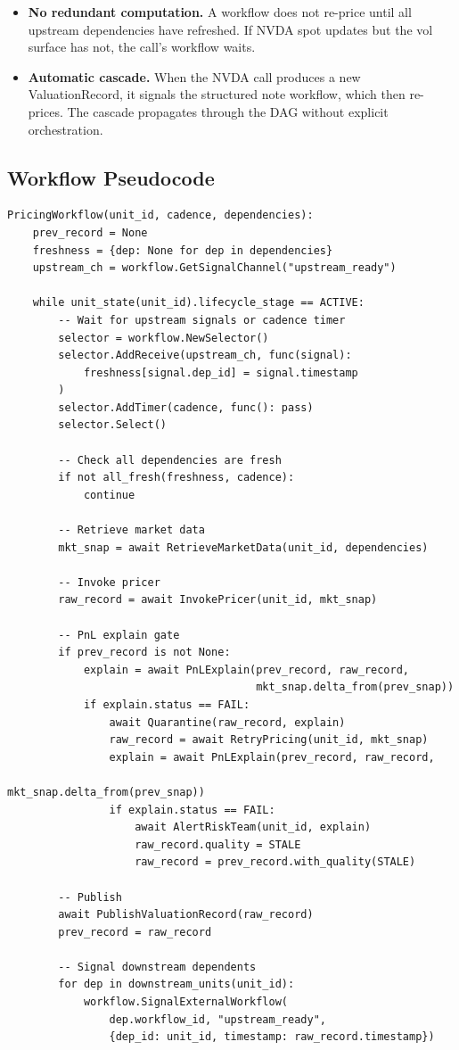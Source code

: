 \documentclass[11pt,a4paper]{article}
\begin{document}
\begin{itemize}[nosep]
\item \textbf{No redundant computation.}  A workflow does not re-price until all upstream dependencies have refreshed.  If NVDA spot updates but the vol surface has not, the call's workflow waits.
\item \textbf{Automatic cascade.}  When the NVDA call produces a new ValuationRecord, it signals the structured note workflow, which then re-prices.  The cascade propagates through the DAG without explicit orchestration.
\end{itemize}

\subsection{Workflow Pseudocode}

\begin{lstlisting}
PricingWorkflow(unit_id, cadence, dependencies):
    prev_record = None
    freshness = {dep: None for dep in dependencies}
    upstream_ch = workflow.GetSignalChannel("upstream_ready")

    while unit_state(unit_id).lifecycle_stage == ACTIVE:
        -- Wait for upstream signals or cadence timer
        selector = workflow.NewSelector()
        selector.AddReceive(upstream_ch, func(signal):
            freshness[signal.dep_id] = signal.timestamp
        )
        selector.AddTimer(cadence, func(): pass)
        selector.Select()

        -- Check all dependencies are fresh
        if not all_fresh(freshness, cadence):
            continue

        -- Retrieve market data
        mkt_snap = await RetrieveMarketData(unit_id, dependencies)

        -- Invoke pricer
        raw_record = await InvokePricer(unit_id, mkt_snap)

        -- PnL explain gate
        if prev_record is not None:
            explain = await PnLExplain(prev_record, raw_record,
                                       mkt_snap.delta_from(prev_snap))
            if explain.status == FAIL:
                await Quarantine(raw_record, explain)
                raw_record = await RetryPricing(unit_id, mkt_snap)
                explain = await PnLExplain(prev_record, raw_record,
                                           mkt_snap.delta_from(prev_snap))
                if explain.status == FAIL:
                    await AlertRiskTeam(unit_id, explain)
                    raw_record.quality = STALE
                    raw_record = prev_record.with_quality(STALE)

        -- Publish
        await PublishValuationRecord(raw_record)
        prev_record = raw_record

        -- Signal downstream dependents
        for dep in downstream_units(unit_id):
            workflow.SignalExternalWorkflow(
                dep.workflow_id, "upstream_ready",
                {dep_id: unit_id, timestamp: raw_record.timestamp})
\end{lstlisting}
\end{document}
